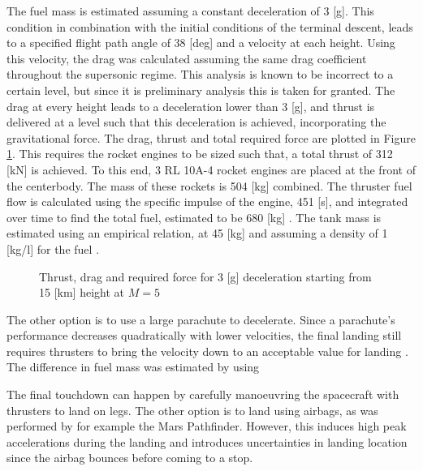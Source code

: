 The fuel mass is estimated assuming a constant deceleration of 3 [g]. This condition in combination with the initial conditions of the terminal descent, leads to a specified flight path angle of 38 [deg] and a velocity at each height. Using this velocity, the drag was calculated assuming the same drag coefficient throughout the supersonic regime. This analysis is known to be incorrect to a certain level, but since it is preliminary analysis this is taken for granted. The drag at every height leads to a deceleration lower than 3 [g], and thrust is delivered at a level such that this deceleration is achieved, incorporating the gravitational force. The drag, thrust and total required force are plotted in Figure \ref{fig:TDforce}. This requires the rocket engines to be sized such that, a total thrust of 312 [kN] is achieved. To this end, 3 RL 10A-4 rocket engines are placed at the front of the centerbody. The mass of these rockets is 504 [kg] combined. The thruster fuel flow is calculated using the specific impulse of the engine, 451 [s], and integrated over time to find the total fuel, estimated to be 680 [kg] \cite{Wertz2011}. The tank mass is estimated using an empirical relation, at 45 [kg] and assuming a density of 1 [kg/l] for the fuel \cite{Wertz2011}.

\begin{figure}
	\centering
	\setlength{} 
	\setlength{}
	
	\caption{Thrust, drag and required force for 3 [g] deceleration starting from 15 [km] height at $M=5$}
	\label{fig:TDforce}
\end{figure}


The other option is to use a large parachute to decelerate. Since a parachute's performance decreases quadratically with lower velocities, the final landing still requires thrusters to bring the velocity down to an acceptable value for landing \cite{Braun2007}. The difference in fuel mass was estimated by using 

The final touchdown can happen by carefully manoeuvring the spacecraft with thrusters to land on legs. The other option is to land using airbags, as was performed by for example the Mars Pathfinder. However, this induces high peak accelerations during the landing and introduces uncertainties in landing location since the airbag bounces before coming to a stop.

